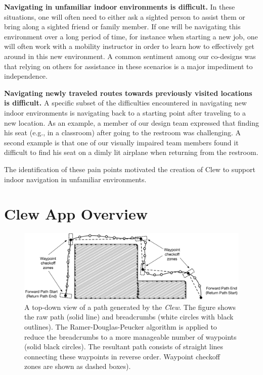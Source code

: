 \documentclass[chi_draft]{sigchi}
\begin{document}
\textbf{Navigating in unfamiliar indoor environments is difficult.} In these situations, one will often need to either ask a sighted person to assist them or bring along a sighted friend or family member.  If one will be navigating this environment over a long period of time, for instance when starting a new job, one will often work with a mobility instructor in order to learn how to effectively get around in this new environment.  A common sentiment among our co-designs was that relying on others for assistance in these scenarios is a major impediment to independence.

\textbf{Navigating newly traveled routes towards previously visited locations is difficult.} A specific subset of the difficulties encountered in navigating new indoor environments is navigating back to a starting point after traveling to a new location.  As an example, a member of our design team expressed that finding his seat (e.g., in a classroom) after going to the restroom was challenging.  A second example is that one of our visually impaired team members found it difficult to find his seat on a dimly lit airplane when returning from the restroom.

The identification of these pain points motivated the creation of Clew to support indoor navigation in unfamiliar environments.%

\section{Clew App Overview}\label{sec:clewoverview}

\begin{figure}
\begin{center}
\includegraphics[width=\linewidth]{Figures/samplepath}
\end{center}
\caption{A top-down view of a path generated by the \emph{Clew}.  The figure shows the raw path (solid line) and breadcrumbs (white circles with black outlines).  The Ramer-Douglas-Peucker algorithm is applied to reduce the breadcrumbs to a more manageable number of waypoints (solid black circles).  The resultant path consists of straight lines connecting these waypoints in reverse order.  Waypoint checkoff zones are shown as dashed boxes).\label{fig:samplepath}}
\end{figure}
\end{document}
